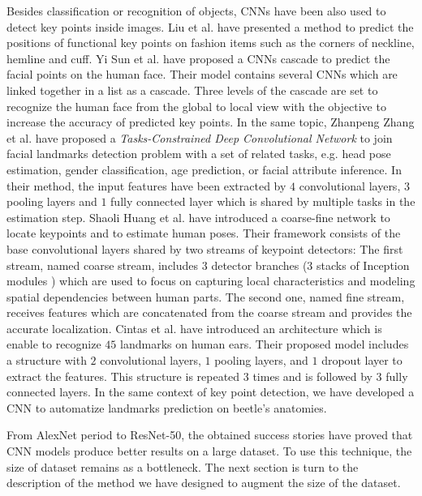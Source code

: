 \documentclass[review]{elsarticle}
\begin{document}
Besides classification or recognition of objects, CNNs have been also used to detect key points inside images. Liu et al. \cite{liu2016fashion} have presented a method to predict the positions of functional key points on fashion items such as the corners of neckline, hemline and cuff. Yi Sun et al. \cite{sun2013deep} have proposed a CNNs cascade to predict the facial points on the human face. 
Their model contains several CNNs which are linked together in a list as a cascade. Three levels of the cascade are set to recognize the human face from the global to local view with the objective to increase the accuracy of predicted key points. In the same topic, Zhanpeng Zhang et al. \cite{zhang2014facial} have proposed a \textit{Tasks-Constrained Deep Convolutional Network} to join facial landmarks detection problem with a set of related tasks, e.g. head pose estimation, gender classification, age prediction, or facial attribute inference. In their method, the input features have been extracted by $4$ convolutional layers, $3$ pooling layers and $1$ fully connected layer which is shared by  multiple tasks in the estimation step. Shaoli Huang et al. \cite{huang2017coarse} have introduced a coarse-fine network to locate keypoints and to estimate human poses. Their framework consists of the base convolutional layers shared by two streams of keypoint detectors: The first stream, named coarse stream, includes $3$ detector branches (3 stacks of Inception modules \cite{szegedy2015going}) which are used to focus on capturing local characteristics and modeling spatial dependencies between human parts. The second one, named fine stream, receives features which are concatenated from the coarse stream and provides the accurate localization. Cintas et al. \cite{cintas2016automatic} have introduced an architecture which is enable to recognize $45$ landmarks on human ears. Their proposed model includes a structure with $2$ convolutional layers, $1$ pooling layers, and $1$ dropout layer to extract the features. This structure is repeated $3$ times and is followed by 3 fully connected layers. In the same context of key point detection, we have developed a CNN to automatize landmarks prediction on beetle's anatomies. 

From AlexNet period to ResNet-50, the obtained success stories \cite{krizhevsky2012imagenet,he2016deep} have proved that CNN models produce better results on a large dataset. To use this technique, the size of dataset remains as a bottleneck. The next section is turn to the description of the method we have designed to augment the size of the dataset.
\end{document}
